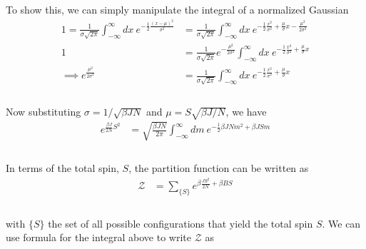 \documentclass[]{article}
\begin{document}
\begin{enumerate}[1.]
\begin{enumerate}[i.]
To show this, we can simply manipulate the integral of a normalized Gaussian\\

\begin{equation}
\begin{aligned}
1 =  \frac{ 1 }{  \sigma \sqrt{  2 \pi }   } \int_{-\infty}^{\infty} dx \: e^{ -  \frac{1}{2} \frac{ ( x - \mu )^2 }{ \sigma^2 }  }  & =      \frac{ 1 }{  \sigma \sqrt{  2 \pi }   } \int_{-\infty}^{\infty} dx \: e^{ -  \frac{1}{2} \frac{ x^2 }{ \sigma^2 } +  \frac{ \mu }{ \sigma } x -  \frac{ \mu^2 }{ 2 \sigma^2 }  }  \\
%
1 & =      \frac{ 1 }{  \sigma \sqrt{  2 \pi }   } e^{ -  \frac{ \mu^2 }{ 2 \sigma^2 }}    \int_{-\infty}^{\infty} dx \: e^{ -  \frac{1}{2} \frac{ x^2 }{ \sigma^2 } +  \frac{ \mu }{ \sigma } x   }  \\
\implies e^{   \frac{ \mu^2 }{ 2 \sigma^2 }}  & =  \frac{ 1 }{  \sigma \sqrt{  2 \pi }   }  \int_{-\infty}^{\infty} dx \: e^{ -  \frac{1}{2} \frac{ x^2 }{ \sigma^2 } +  \frac{ \mu }{ \sigma } x   }  \\
\end{aligned}
\end{equation} \\

Now substituting $\sigma = 1/ \sqrt{ \beta J N }$ and $ \mu  = S  \sqrt{ \beta J/ N} $, we have \\

\begin{equation}
\begin{aligned}
e^{   \frac{ \beta J }{ 2 N } S^2 }  & =  \sqrt{ \frac{ \beta J N}{ 2 \pi }   }  \int_{-\infty}^{\infty} dm \: e^{ -  \frac{1}{2} \beta J N m^2 + \beta J S m} \\
\end{aligned}
\end{equation} \\

In terms of the total spin, $S$, the partition function can be written as \\

\begin{equation}
\begin{aligned}
\mathcal{Z} & = \sum_{ \{ S \} } e^{   \beta \frac{ J S^2 }{ 2 N}  +  \beta B S   }\\
\end{aligned}
\end{equation} \\

with $\{ S \}$ the set of all possible configurations that yield the total spin $S$. We can use formula for the integral above to write $\mathcal{Z}$ as \\


\end{enumerate}
\end{enumerate}
\end{document}
